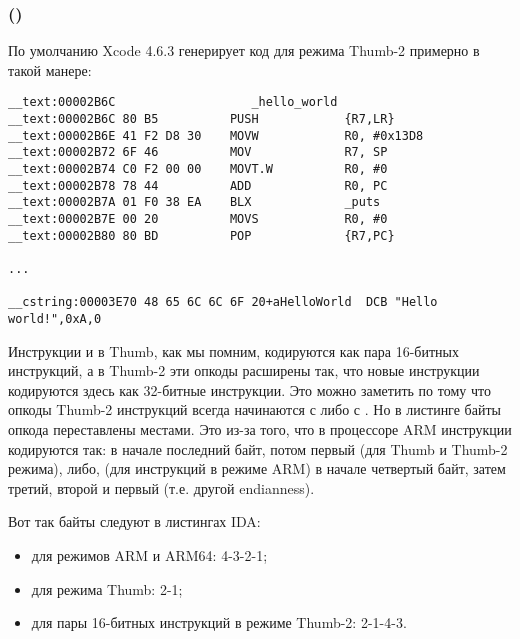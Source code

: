 \subsubsection{\OptimizingXcodeIV (\ThumbTwoMode)}

По умолчанию Xcode 4.6.3 генерирует код для режима Thumb-2 примерно в такой манере:

\begin{lstlisting}[caption=\OptimizingXcodeIV (\ThumbTwoMode),style=customasmARM]
__text:00002B6C                   _hello_world
__text:00002B6C 80 B5          PUSH            {R7,LR}
__text:00002B6E 41 F2 D8 30    MOVW            R0, #0x13D8
__text:00002B72 6F 46          MOV             R7, SP
__text:00002B74 C0 F2 00 00    MOVT.W          R0, #0
__text:00002B78 78 44          ADD             R0, PC
__text:00002B7A 01 F0 38 EA    BLX             _puts
__text:00002B7E 00 20          MOVS            R0, #0
__text:00002B80 80 BD          POP             {R7,PC}

...

__cstring:00003E70 48 65 6C 6C 6F 20+aHelloWorld  DCB "Hello world!",0xA,0
\end{lstlisting}


\myindex{\ThumbTwoMode}
Инструкции  и  в Thumb, как мы помним, кодируются как пара 16-битных инструкций, 
а в Thumb-2 эти  опкоды расширены так, что новые инструкции кодируются здесь как 
32-битные инструкции.
Это можно заметить по тому что опкоды Thumb-2 инструкций всегда начинаются с  либо с .
Но в листинге \IDA байты опкода переставлены местами.
Это из-за того, что в процессоре ARM инструкции кодируются так:
в начале последний байт, потом первый (для Thumb и Thumb-2 режима), либо, 
(для инструкций в режиме ARM) в начале четвертый байт, затем третий, второй и первый 
(т.е. другой \gls{endianness}).

Вот так байты следуют в листингах IDA:

\begin{itemize}
\item для режимов ARM и ARM64: 4-3-2-1;
\item для режима Thumb: 2-1;
\item для пары 16-битных инструкций в режиме Thumb-2: 2-1-4-3.
\end{itemize}

